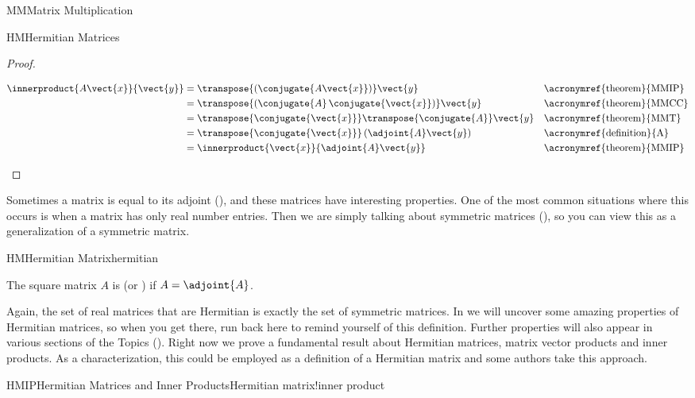 \begin{subsect}{MM}{Matrix Multiplication}
\begin{subsect}{HM}{Hermitian Matrices}
\begin{proof}
%
\begin{para}
\begin{align*}
\innerproduct{A\vect{x}}{\vect{y}}
&=\transpose{\left(\conjugate{A\vect{x}}\right)}\vect{y}
&&\text{\acronymref{theorem}{MMIP}}\\
&=\transpose{\left(\conjugate{A}\,\conjugate{\vect{x}}\right)}\vect{y}
&&\text{\acronymref{theorem}{MMCC}}\\
&=\transpose{\conjugate{\vect{x}}}\transpose{\conjugate{A}}\vect{y}
&&\text{\acronymref{theorem}{MMT}}\\
&=\transpose{\conjugate{\vect{x}}}\left(\adjoint{A}\vect{y}\right)
&&\text{\acronymref{definition}{A}}\\
&=\innerproduct{\vect{x}}{\adjoint{A}\vect{y}}
&&\text{\acronymref{theorem}{MMIP}}
\end{align*}
\end{para}
%
\end{proof}
%
\begin{para}Sometimes a matrix is equal to its adjoint (), and these matrices have interesting properties.  One of the most common situations where this occurs is when a matrix has only real number entries.  Then we are simply talking about symmetric matrices (), so you can view this as a generalization of a symmetric matrix.\end{para}
%
\begin{definition}{HM}{Hermitian Matrix}{hermitian}
\begin{para}The square matrix $A$ is  (or ) if $A=\adjoint{A}$.\end{para}
\end{definition}
%
\begin{para}Again, the set of real matrices that are Hermitian is exactly the set of symmetric matrices.  In  we will uncover some amazing properties of Hermitian matrices, so when you get there, run back here  to remind yourself of this definition.  Further properties will also appear in various sections of the Topics ().  Right now we prove a fundamental result about Hermitian matrices, matrix vector products and inner products.  As a characterization, this could be employed as a definition of a Hermitian matrix and some authors take this approach.\end{para}
%
%
\begin{theorem}{HMIP}{Hermitian Matrices and Inner Products}{Hermitian matrix!inner product}

\end{theorem}
\end{subsect}
\end{subsect}
